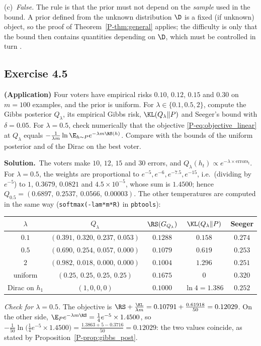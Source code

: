 \documentclass[11pt]{article}
\newcommand{\statement}[1]{\begin{tcolorbox}[enhanced,breakable,colback=black!3,colframe=black!25,boxrule=0.4pt,sharp corners,fontupper=\itshape\small]#1\end{tcolorbox}}
\newcommand{\exo}[1]{\Needspace{6\baselineskip}\subsection*{Exercise #1}\addcontentsline{toc}{subsection}{Exercise #1}}
\newcommand{\sol}{\noindent\textbf{Solution.}\ }
\begin{document}
(c)~\emph{False.} The rule is that the prior must not depend on the \emph{sample} used in the bound. A prior defined from the
unknown distribution $\D$ is a fixed (if unknown) object, so the proof of Theorem~\ref{P-thm:general} applies; the difficulty is
only that the bound then contains quantities depending on $\D$, which must be controlled in turn \citep{catoni2007pac}.

\exo{4.5}
\statement{\textbf{(Application)} Four voters have empirical risks $0.10$, $0.12$, $0.15$ and $0.30$ on $m=100$ examples, and the prior is
uniform. For $\lambda\in\{0.1,0.5,2\}$, compute the Gibbs posterior $Q_\lambda$, its empirical Gibbs risk, $\KL(Q_\lambda\|P)$ and Seeger's bound
with $\delta=0.05$. For $\lambda=0.5$, check numerically that the objective \eqref{P-eq:objective_linear} at $Q_\lambda$ equals
$-\frac1{\lambda m}\ln\E_{h\sim P}e^{-\lambda m\RS(h)}$. Compare with the bounds of the uniform posterior and of the Dirac on the best voter.}

\sol The voters make $10$, $12$, $15$ and $30$ errors, and $Q_\lambda(h_t)\propto e^{-\lambda\times\text{errors}_t}$. For $\lambda=0.5$, the weights are
proportional to $e^{-5},e^{-6},e^{-7.5},e^{-15}$, i.e.\ (dividing by $e^{-5}$) to $1$, $0.3679$, $0.0821$ and $4.5\times10^{-5}$, whose sum is
$1.4500$; hence $Q_{0.5}=(0.6897,\ 0.2537,\ 0.0566,\ 0.00003)$. The other temperatures are computed in the same way
(\texttt{softmax(-lam*m*R)} in \texttt{pbtools}):
\begin{center}\small
\begin{tabular}{ccccc}
\toprule
$\lambda$ & $Q_\lambda$ & $\RS(G_{Q_\lambda})$ & $\KL(Q_\lambda\|P)$ & Seeger \\
\midrule
$0.1$ & $(0.391,\,0.320,\,0.237,\,0.053)$ & $0.1288$ & $0.158$ & $0.274$ \\
$0.5$ & $(0.690,\,0.254,\,0.057,\,0.000)$ & $0.1079$ & $0.619$ & $0.253$ \\
$2$ & $(0.982,\,0.018,\,0.000,\,0.000)$ & $0.1004$ & $1.296$ & $0.251$ \\
\midrule
uniform & $(0.25,\,0.25,\,0.25,\,0.25)$ & $0.1675$ & $0$ & $0.320$ \\
Dirac on $h_1$ & $(1,0,0,0)$ & $0.1000$ & $\ln4=1.386$ & $0.252$ \\
\bottomrule
\end{tabular}
\end{center}
\emph{Check for $\lambda=0.5$.} The objective is $\RS+\frac{\KL}{\lambda m}=0.10791+\frac{0.61918}{50}=0.12029$. On the other side,
$\E_Pe^{-\lambda m\RS}=\frac14e^{-5}\times1.4500$, so $-\frac1{50}\ln\big(\frac14e^{-5}\times1.4500\big)=\frac{1.3863+5-0.3716}{50}=0.12029$: the two values
coincide, as stated by Proposition~\ref{P-prop:gibbs_post}.
\end{document}
